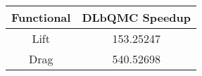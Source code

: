 \begin{tabular}{|c|c|}
\hline
Functional&DLbQMC Speedup\\ 
\hline

Lift & 153.25247\\ 
\hline
Drag & 540.52698\\ 
\hline
\end{tabular}

